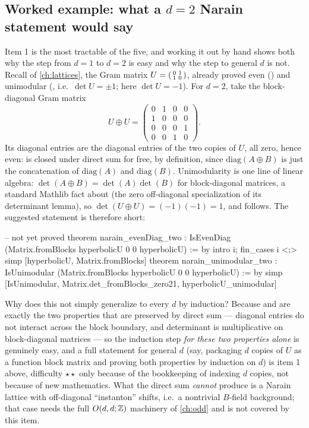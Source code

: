 \subsection{Worked example: what a $d=2$ Narain statement would say}\label{sec:open:narain2}

Item 1 is the most tractable of the five, and working it out by hand shows both why the
step from $d=1$ to $d=2$ is easy and why the step to general $d$ is not. Recall
 of \cref{ch:lattices}, the Gram matrix $U=\begin{psmallmatrix}0&1\\1&0
\end{psmallmatrix}$, already proved even () and unimodular
(, i.e.\ $\det U=\pm1$; here $\det U=-1$). For $d=2$, take
the block-diagonal Gram matrix
\begin{equation}\label{eq:open:blockU}
  U\oplus U=\begin{pmatrix}0&1&0&0\\1&0&0&0\\0&0&0&1\\0&0&1&0\end{pmatrix}.
\end{equation}
Its diagonal entries are the diagonal entries of the two copies of $U$, all zero, hence
even:  is closed under direct sum for free, by definition, since
$\text{diag}(A\oplus B)$ is just the concatenation of $\text{diag}(A)$ and
$\text{diag}(B)$. Unimodularity is one line of linear algebra:
$\det(A\oplus B)=\det(A)\det(B)$ for block-diagonal matrices, a standard Mathlib fact
about  (the zero off-diagonal specialization of its determinant
lemma), so $\det(U\oplus U)=(-1)(-1)=1$, and  follows. The suggested
statement is therefore short:
\begin{leancode}
-- not yet proved
theorem narain_evenDiag_two :
    IsEvenDiag (Matrix.fromBlocks hyperbolicU 0 0 hyperbolicU) := by
  intro i; fin_cases i <;> simp [hyperbolicU, Matrix.fromBlocks]
theorem narain_unimodular_two :
    IsUnimodular (Matrix.fromBlocks hyperbolicU 0 0 hyperbolicU) := by
  simp [IsUnimodular, Matrix.det_fromBlocks_zero21, hyperbolicU_unimodular]
\end{leancode}
Why does this not simply generalize to every $d$ by induction? Because 
and  are exactly the two properties that are preserved by direct sum
--- diagonal entries do not interact across the block boundary, and determinant is
multiplicative on block-diagonal matrices --- so the induction step \emph{for these two
properties alone} is genuinely easy, and a full statement for general $d$ (say, packaging
$d$ copies of $U$ as a function  block matrix and proving
both properties by induction on $d$) is item 1 above, difficulty $\star\star$ only because
of the bookkeeping of indexing $d$ copies, not because of new mathematics. What the direct
sum \emph{cannot} produce is a Narain lattice with off-diagonal ``instanton'' shifts, i.e.\
a nontrivial $B$-field background; that case needs the full $O(d,d;\mathbb{Z})$ machinery of
\cref{ch:odd} and is not covered by this item.

